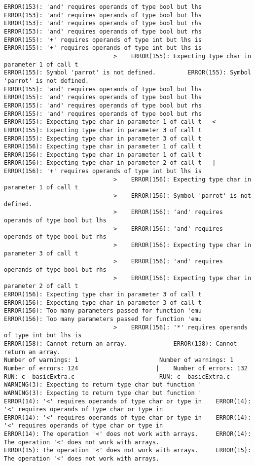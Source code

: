 \documentclass[12pt]{book}
\begin{document}
\begin{lstlisting}
ERROR(153): 'and' requires operands of type bool but lhs	ERROR(153): 'and' requires operands of type bool but lhs
ERROR(153): 'and' requires operands of type bool but rhs	ERROR(153): 'and' requires operands of type bool but rhs
ERROR(155): '+' requires operands of type int but lhs is	ERROR(155): '+' requires operands of type int but lhs is
							   >	ERROR(155): Expecting type char in parameter 1 of call t
ERROR(155): Symbol 'parrot' is not defined.			ERROR(155): Symbol 'parrot' is not defined.
ERROR(155): 'and' requires operands of type bool but lhs	ERROR(155): 'and' requires operands of type bool but lhs
ERROR(155): 'and' requires operands of type bool but rhs	ERROR(155): 'and' requires operands of type bool but rhs
ERROR(155): Expecting type char in parameter 1 of call t   <
ERROR(155): Expecting type char in parameter 3 of call t	ERROR(155): Expecting type char in parameter 3 of call t
ERROR(156): Expecting type char in parameter 1 of call t	ERROR(156): Expecting type char in parameter 1 of call t
ERROR(156): Expecting type char in parameter 2 of call t   |	ERROR(156): '+' requires operands of type int but lhs is
							   >	ERROR(156): Expecting type char in parameter 1 of call t
							   >	ERROR(156): Symbol 'parrot' is not defined.
							   >	ERROR(156): 'and' requires operands of type bool but lhs
							   >	ERROR(156): 'and' requires operands of type bool but rhs
							   >	ERROR(156): Expecting type char in parameter 3 of call t
							   >	ERROR(156): 'and' requires operands of type bool but rhs
							   >	ERROR(156): Expecting type char in parameter 2 of call t
ERROR(156): Expecting type char in parameter 3 of call t	ERROR(156): Expecting type char in parameter 3 of call t
ERROR(156): Too many parameters passed for function 'emu	ERROR(156): Too many parameters passed for function 'emu
							   >	ERROR(156): '*' requires operands of type int but lhs is
ERROR(158): Cannot return an array.				ERROR(158): Cannot return an array.
Number of warnings: 1						Number of warnings: 1
Number of errors: 124					   |	Number of errors: 132
RUN: c- basicExtra.c-						RUN: c- basicExtra.c-
WARNING(3): Expecting to return type char but function '	WARNING(3): Expecting to return type char but function '
ERROR(14): '<' requires operands of type char or type in	ERROR(14): '<' requires operands of type char or type in
ERROR(14): '<' requires operands of type char or type in	ERROR(14): '<' requires operands of type char or type in
ERROR(14): The operation '<' does not work with arrays.		ERROR(14): The operation '<' does not work with arrays.
ERROR(15): The operation '<' does not work with arrays.		ERROR(15): The operation '<' does not work with arrays.

\end{lstlisting}
\end{document}
